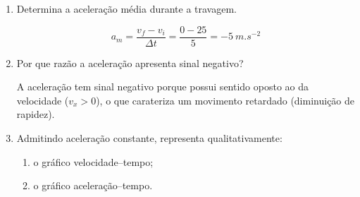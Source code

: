 \documentclass[11pt,a4paper]{article}
\begin{document}
	\begin{enumerate}[label=\textbf{\arabic*.},resume]
		
		\item Determina a aceleração média durante a travagem.
		
		\begin{solucao}
			\[
			a_m = \frac{v_f - v_i}{\Delta t} = \frac{0 - 25}{5} = \SI{-5}{m.s^{-2}}
			\]
		\end{solucao}
		
		\item Por que razão a aceleração apresenta sinal negativo?
		
		\begin{solucao}
			A aceleração tem sinal negativo porque possui sentido oposto ao da velocidade ($v_x > 0$), o que carateriza um movimento retardado (diminuição de rapidez).
		\end{solucao}
		
		\item Admitindo aceleração constante, representa qualitativamente:
		
		\begin{enumerate}[label=\alph*)]
			
			\item o gráfico velocidade--tempo;
			
			\item o gráfico aceleração--tempo.
			
		\end{enumerate}
		
		\begin{solucao}
			\begin{center}
				\begin{minipage}{0.48\textwidth}
				\end{minipage}
				\hfill
				\begin{minipage}{0.48\textwidth}
				\end{minipage}
			\end{center}
		\end{solucao}
		

\end{enumerate}
\end{document}
